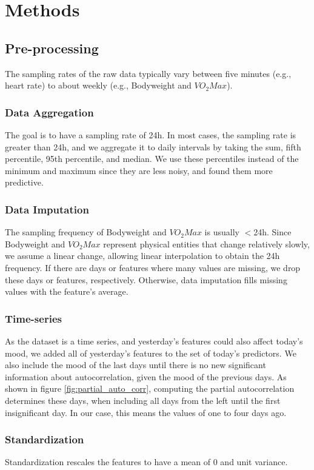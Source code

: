 \documentclass[conference]{IEEEtran}
\begin{document}
\section{Methods}
\subsection{Pre-processing}
The sampling rates of the raw data typically vary between five minutes (e.g., heart rate) to  about weekly (e.g., Bodyweight and $VO_2Max$).

\subsubsection{Data Aggregation}
The goal is to have a sampling rate of 24h.
In most cases, the sampling rate is greater than 24h, and we aggregate it to daily intervals by taking the sum, fifth percentile, 95th percentile, and median.
We use these percentiles instead of the minimum and maximum since they are less noisy, and found them more predictive.

\subsubsection{Data Imputation}
The sampling frequency of Bodyweight and $VO_2Max$ is usually $<$24h.
Since Bodyweight and $VO_2Max$ represent physical entities that change relatively slowly, we assume a linear change, allowing linear interpolation to obtain the 24h frequency.
If there are days or features where many values are missing, we drop these days or features, respectively.
Otherwise, data imputation fills missing values with the feature's average.

\subsubsection{Time-series} 
\label{sec:time-series}
As the dataset is a time series, and yesterday's features could also affect today's mood, we added all of yesterday's features to the set of today's predictors.
We also include the mood of the last days until there is no new significant information about autocorrelation, given the mood of the previous days.
As shown in figure \ref{fig:partial_auto_corr}, computing the partial autocorrelation\cite{durre_robust_2015} determines these days, when including all days from the left until the first insignificant day.
In our case, this means the values of one to four days ago.


\subsubsection{Standardization}
Standardization rescales the features to have a mean of 0 and unit variance.
\end{document}

